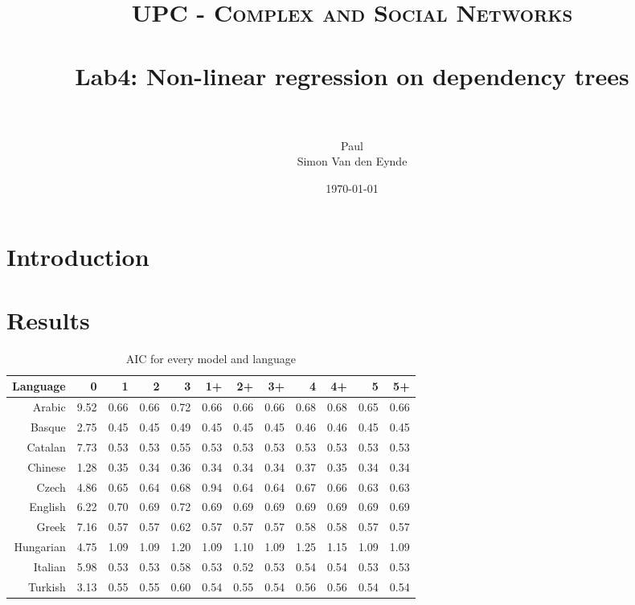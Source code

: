 \documentclass[paper=a4, fontsize=11pt]{scrartcl} %
\title{	
\normalfont \normalsize 
\textsc{UPC - Complex and Social Networks} \\ [25pt] %
\horrule{0.5pt} \\[0.4cm] %
\huge Lab4: Non-linear regression on dependency trees \\ %
\horrule{2pt} \\[0.5cm] %
}
\author{Paul\\Simon Van den Eynde} %
\date{\normalsize\today} %
\begin{document}
\maketitle %



\section{Introduction}

\section{Results}
\begin{table}
\begin{adjustbox}{center}
\centering
\begin{tabular}{rrrrrrrrrrrr}
  Language & 0 & 1 & 2 & 3 & 1+ & 2+ & 3+ & 4 & 4+ & 5 & 5+ \\ 
  \midrule
Arabic & 9.52 & 0.66 & 0.66 & 0.72 & 0.66 & 0.66 & 0.66 & 0.68 & 0.68 & 0.65 & 0.66 \\ 
  Basque & 2.75 & 0.45 & 0.45 & 0.49 & 0.45 & 0.45 & 0.45 & 0.46 & 0.46 & 0.45 & 0.45 \\ 
  Catalan & 7.73 & 0.53 & 0.53 & 0.55 & 0.53 & 0.53 & 0.53 & 0.53 & 0.53 & 0.53 & 0.53 \\ 
  Chinese & 1.28 & 0.35 & 0.34 & 0.36 & 0.34 & 0.34 & 0.34 & 0.37 & 0.35 & 0.34 & 0.34 \\ 
  Czech & 4.86 & 0.65 & 0.64 & 0.68 & 0.94 & 0.64 & 0.64 & 0.67 & 0.66 & 0.63 & 0.63 \\ 
  English & 6.22 & 0.70 & 0.69 & 0.72 & 0.69 & 0.69 & 0.69 & 0.69 & 0.69 & 0.69 & 0.69 \\ 
  Greek & 7.16 & 0.57 & 0.57 & 0.62 & 0.57 & 0.57 & 0.57 & 0.58 & 0.58 & 0.57 & 0.57 \\ 
  Hungarian & 4.75 & 1.09 & 1.09 & 1.20 & 1.09 & 1.10 & 1.09 & 1.25 & 1.15 & 1.09 & 1.09 \\ 
  Italian & 5.98 & 0.53 & 0.53 & 0.58 & 0.53 & 0.52 & 0.53 & 0.54 & 0.54 & 0.53 & 0.53 \\ 
  Turkish & 3.13 & 0.55 & 0.55 & 0.60 & 0.54 & 0.55 & 0.54 & 0.56 & 0.56 & 0.54 & 0.54 \\ 
   \bottomrule
\end{tabular}
\end{adjustbox}
\caption{AIC for every model and language}
\end{table}
\end{document}
